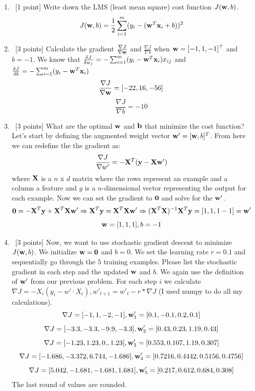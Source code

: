 \documentclass[12pt, fullpage,letterpaper]{article}
\begin{document}
\begin{enumerate}
\begin{enumerate}
	\item~[1 point] Write down the LMS (least mean square) cost function $J({\bf w}, b)$. 
	\[J({\bf w}, b) = \frac{1}{2}\sum_{i=1}^m (y_i - ({\bf w}^T{\bf x}_i + b))^2\]
	\item~[3 points] Calculate the gradient $\frac{\nabla J}{\nabla {\bf w}}$ and $\frac{\nabla J}{\nabla b}$ when ${\bf w} = [-1,1,-1]^\top$ and $b = -1$.
	We know that $\frac{\delta J}{\delta w_j} = - \sum_{i=1}^m (y_i - {\bf w}^T{\bf x}_i)x_{ij}$ and $\frac{\delta J}{\delta b} = - \sum_{i=1}^m (y_i - {\bf w}^T{\bf x}_i)$
	\[\frac{\nabla J}{\nabla {\bf w}} = [-22, 16, -56]\]
	\[\frac{\nabla J}{\nabla b} = -10\]
	\item~[3 points] What are the optimal ${\bf w}$ and ${\bf b}$ that minimize the cost function? \newline
	Let's start by defining the augmented weight vector ${\bf w}' = [{\bf w}, b]^T$.  From here we can redefine the the gradient as:
	\[\frac{\nabla J}{\nabla w'} = - {\bf X}^T({\bf y}-{\bf X}{\bf w}')\]
	where ${\bf X}$ is a $n$ x $d$ matrix where the rows represent an example and a column a feature and $y$ is a $n$-dimensional vector representing the output for each example. Now we can set the gradient to ${\bf 0}$ and solve for the ${\bf w}'$.
	\[{\bf 0} = -{\bf X}^T{\bf y} + {\bf X}^T{\bf X}{\bf w}' \Rightarrow {\bf X}^T{\bf y} = {\bf X}^T{\bf X}{\bf w}' \Rightarrow ({\bf X}^T{\bf X})^{-1}{\bf X}^T{\bf y} = [1,1,1-1] = {\bf w}'\]
	\[{\bf w} = [1, 1, 1], b = -1\]
	\item~[3 points] Now, we want to use stochastic gradient descent to minimize $J({\bf w}, b)$. We initialize ${\bf w} = {\bf 0}$ and $b = 0$. We set the learning rate $r = 0.1$ and sequentially go through the $5$ training examples. Please list the stochastic gradient in each step and the updated ${\bf w}$ and $b$.
	\newline We again use the definition of ${\bf w}'$ from our previous problem. For each step $i$ we calculate $\nabla J = -X_i(y_i - w' \cdot X_i), w'_{t+1} = w'_t - r * \nabla J$ (I used numpy to do all my calculations). 
	\[\nabla J = [ -1, 1,  -2,  -1], {\bf w}_1' = [ 0.1, -0.1,  0.2,  0.1]\]
	\[\nabla J = [-3.3, -3.3, -9.9, -3.3], {\bf w}_2' = [0.43, 0.23, 1.19, 0.43]\]
	\[\nabla J = [-1.23,  1.23,  0.  ,  1.23], {\bf w}_3' = [0.553, 0.107, 1.19 , 0.307]\]
	\[\nabla J = [-1.686, -3.372,  6.744, -1.686], {\bf w}_4' = [0.7216, 0.4442, 0.5156, 0.4756]\]
	\[\nabla J = [ 5.042, -1.681, -1.681,  1.681], {\bf w}_5' = [0.217, 0.612, 0.684, 0.308]\]
	The last round of values are rounded.
\end{enumerate}
\end{enumerate}
\end{document}

